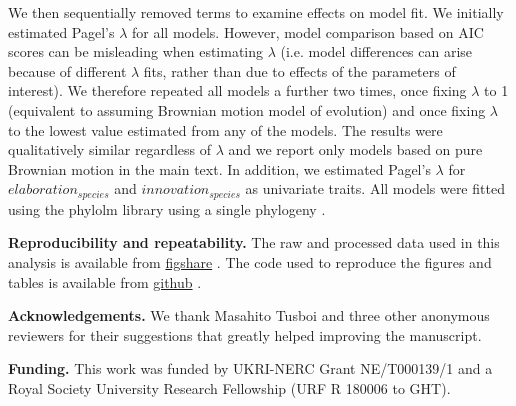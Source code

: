 \documentclass[12pt,letterpaper]{article}
\begin{document}
We then sequentially removed terms to examine effects on model fit.
We initially estimated Pagel's $\lambda$ \cite{pagel1997inferring} for all models.
However, model comparison based on AIC scores can be misleading when estimating $\lambda$ (i.e. model differences can arise because of different $\lambda$ fits, rather than due to effects of the parameters of interest).
We therefore repeated all models a further two times, once fixing $\lambda$ to 1 (equivalent to assuming Brownian motion model of evolution) and once fixing $\lambda$ to the lowest value estimated from any of the models.
The results were qualitatively similar regardless of $\lambda$ and we report only models based on pure Brownian motion in the main text.
In addition, we estimated Pagel’s $\lambda$ for $elaboration_{species}$ and $innovation_{species}$ as univariate traits.
All models were fitted using the phylolm library using a single phylogeny \cite{phylom}.

\textbf{Reproducibility and repeatability.}
The raw and processed data used in this analysis is available from \href{https://figshare.com/articles/dataset/Innovation_and_elaboration_on_the_avian_tree_of_life/20480355}{figshare} \cite{fighsaredata}.
The code used to reproduce the figures and tables is available from \href{https://github.com/TGuillerme/elaboration_exploration_bird_beaks}{github} \cite{githubrepo}.

\textbf{Acknowledgements.}
We thank Masahito Tusboi and three other anonymous reviewers for their suggestions that greatly helped improving the manuscript.

\textbf{Funding.}
This work was funded by UKRI-NERC Grant NE/T000139/1 and a Royal Society University Research Fellowship (URF R 180006 to GHT).




\end{document}
